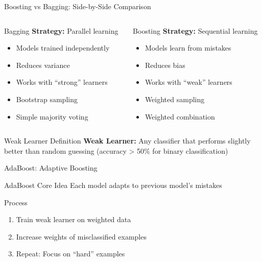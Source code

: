 \documentclass[10pt]{beamer}
\begin{document}
\begin{frame}{Boosting vs Bagging: Side-by-Side Comparison}
\begin{columns}
\begin{column}{0.48\textwidth}
\begin{alertbox}{Bagging}
\textbf{Strategy:} Parallel learning
\begin{itemize}
\item Models trained independently
\item Reduces variance
\item Works with ``strong'' learners
\item Bootstrap sampling
\item Simple majority voting
\end{itemize}
\end{alertbox}
\end{column}

\begin{column}{0.48\textwidth}
\begin{keypointsbox}{Boosting}
\textbf{Strategy:} Sequential learning
\begin{itemize}
\item Models learn from mistakes
\item Reduces bias
\item Works with ``weak'' learners
\item Weighted sampling
\item Weighted combination
\end{itemize}
\end{keypointsbox}
\end{column}
\end{columns}

\begin{definitionbox}{Weak Learner Definition}
\small{\textbf{Weak Learner:} Any classifier that performs slightly better than random guessing (accuracy > 50\% for binary classification)}
\end{definitionbox}
\end{frame}

\begin{frame}{AdaBoost: Adaptive Boosting}
\begin{definitionbox}{AdaBoost Core Idea}
Each model adapts to previous model's mistakes
\end{definitionbox}

\begin{keypointsbox}{Process}
\begin{enumerate}
\item Train weak learner on weighted data
\item Increase weights of misclassified examples
\item Repeat: Focus on ``hard'' examples
\end{enumerate}
\end{keypointsbox}
\end{frame}
\end{document}
